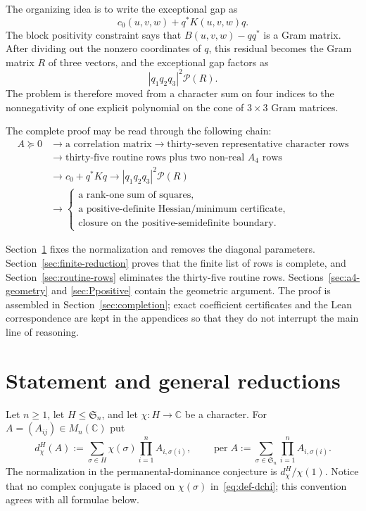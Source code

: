 \documentclass[11pt]{article}
\theoremstyle{definition}
\newcommand{\CC}{\mathbb C}
\newcommand{\Sn}{\mathfrak S}
\newcommand{\per}{\operatorname{per}}
\newcommand{\psd}{\succeq 0}
\begin{document}
The organizing idea is to write the exceptional gap as
\[
 c_0(u,v,w)+q^*K(u,v,w)q.
\]
The block positivity constraint says that $B(u,v,w)-qq^*$ is a Gram matrix.
After dividing out the nonzero coordinates of $q$, this residual becomes the
Gram matrix $R$ of three vectors, and the exceptional gap factors as
\[
 |q_1q_2q_3|^2\mathcal P(R).
\]
The problem is therefore moved from a character sum on four indices to the
nonnegativity of one explicit polynomial on the cone of $3\times3$ Gram
matrices.

The complete proof may be read through the following chain:
\begin{equation*}
\begin{aligned}
A\psd
&\longrightarrow \text{a correlation matrix}
 \longrightarrow \text{thirty-seven representative character rows}\\
&\longrightarrow \text{thirty-five routine rows plus two non-real $A_4$ rows}\\
&\longrightarrow c_0+q^*Kq
 \longrightarrow |q_1q_2q_3|^2\mathcal P(R)\\
&\longrightarrow
 \begin{cases}
 \text{a rank-one sum of squares},\\
 \text{a positive-definite Hessian/minimum certificate},\\
 \text{closure on the positive-semidefinite boundary}.
 \end{cases}
\end{aligned}
\end{equation*}

Section~\ref{sec:statement-reductions} fixes the normalization and removes
the diagonal parameters.  Section~\ref{sec:finite-reduction} proves that the
finite list of rows is complete, and Section~\ref{sec:routine-rows} eliminates
the thirty-five routine rows.  Sections~\ref{sec:a4-geometry} and
\ref{sec:Ppositive} contain the geometric argument.  The proof is assembled
in Section~\ref{sec:completion}; exact coefficient certificates and the Lean
correspondence are kept in the appendices so that they do not interrupt the
main line of reasoning.

\section{Statement and general reductions}\label{sec:statement-reductions}

Let $n\geq1$, let $H\leq\Sn_n$, and let $\chi:H\to\CC$ be a character.
For $A=(A_{ij})\in M_n(\CC)$ put
\begin{equation}\label{eq:def-dchi}
 d_\chi^H(A):=\sum_{\sigma\in H}\chi(\sigma)
   \prod_{i=1}^n A_{i,\sigma(i)},
 \qquad
 \per A:=\sum_{\sigma\in\Sn_n}\prod_{i=1}^n A_{i,\sigma(i)}.
\end{equation}
The normalization in the permanental-dominance conjecture is
$d_\chi^H/\chi(1)$.  Notice that no complex conjugate is placed on
$\chi(\sigma)$ in~\eqref{eq:def-dchi}; this convention agrees with all
formulae below.
\end{document}
